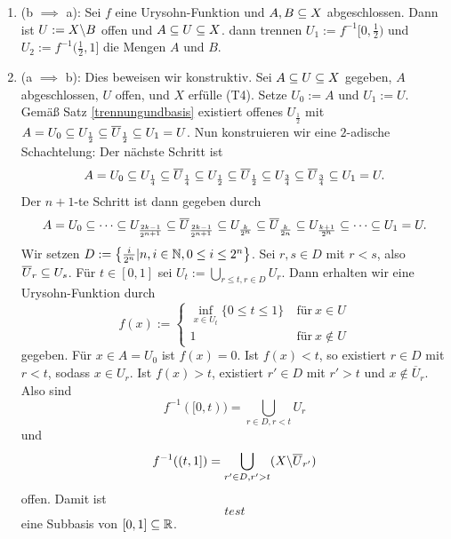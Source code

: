 \begin{beweis}
\begin{enumerate}
\item (b $\implies$ a): Sei $f$ eine Urysohn-Funktion und $A,B \subseteq X$ abgeschlossen. Dann ist $U := X \backslash B$ offen und $A \subseteq U \subseteq X$. dann trennen $U_1 := f^{-1}[0,\frac{1}{2})$ und $U_2 := f^{-1} (\frac{1}{2}, 1]$ die Mengen $A$ und $B$.
\item (a $\implies$ b): Dies beweisen wir konstruktiv. Sei $A \subseteq U \subseteq X$ gegeben, $A$ abgeschlossen, $U$ offen, und $X$ erfülle (T4). Setze $U_0 := A$ und $U_1 := U$. Gemäß Satz \ref{trennungundbasis} existiert offenes $U_{\frac{1}{2}}$ mit $A =U_0 \subseteq U_\frac{1}{2} \subseteq \overline{U}_\frac{1}{2} \subseteq U_1 = U$. Nun konstruieren wir eine $2$-adische Schachtelung: Der nächste Schritt ist
\begin{equation}
A = U_0 \subseteq U_\frac{1}{4} \subseteq \overline{U}_\frac{1}{4} \subseteq U_\frac{1}{2} \subseteq \overline{U}_\frac{1}{2} \subseteq U_\frac{3}{4} \subseteq \overline{U}_\frac{3}{4} \subseteq U_1 = U.
\end{equation}
Der $n+1$-te Schritt ist dann gegeben durch 
\begin{equation}
A=U_0 \subseteq \cdots \subseteq U_\frac{2k-1}{2^{n+1}} \subseteq \overline{U}_\frac{2k-1}{2^{n+1}} \subseteq U_\frac{k}{2^n} \subseteq \overline{U}_\frac{k}{2n} \subseteq U_\frac{k+1}{2^n} \subseteq \cdots \subseteq U_1 = U.
\end{equation}
Wir setzen $D:= \left\{\frac{i}{2^n} | n, i \in \mathbb{N}, 0 \leq i \leq 2^n \right\}$. Sei $r,s \in D$ mit $r<s$, also $\overline{U}_r \subseteq U_s$. Für $t \in [0,1]$ sei $U_t := \bigcup_{r \leq t, r \in D} U_r$. Dann erhalten wir eine Urysohn-Funktion durch
\begin{equation}
f(x):= 
\begin{cases}
\inf_{x \in U_t} \{0 \leq t \leq 1\} \ &\text{für} \ x \in U\\
1 \ &\text{für} \ x \notin U
\end{cases}
\end{equation}
gegeben. Für $x \in A = U_0$ ist $f(x)=0$. Ist $f(x)<t$, so existiert $r \in D$ mit $r<t$, sodass $x \in U_r$. Ist $f(x)>t$, existiert $r' \in D$ mit $r'>t$ und $x \notin \overline{U}_r$. Also sind 
\begin{equation}
f^{-1}([0,t)) = \bigcup_{r \in D, r <t} U_r
\end{equation}
und
\begin{equation}
f^{-1}((t,1]) = \bigcup_{r' \in D, r' > t} (X \backslash \overline{U}_{r'})
\end{equation}
offen. Damit ist 
\begin{equation}
test
\end{equation}
eine Subbasis von $[0,1] \subseteq \mathbb{R}$.
\end{enumerate}
\end{beweis}
